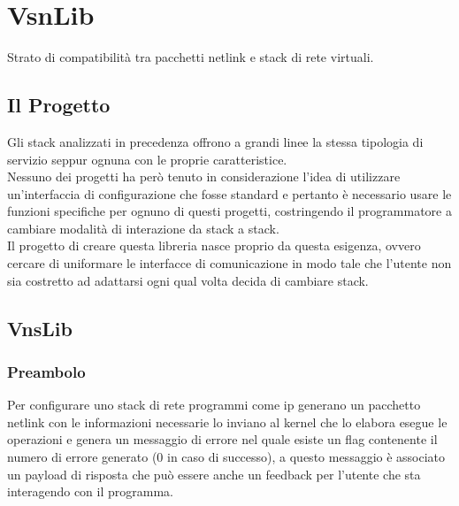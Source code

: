 

\chapter{VsnLib}                %
\lhead[\fancyplain{}{\bfseries\thepage}]{\fancyplain{}{\bfseries\rightmark}}
Strato di compatibilit\`a tra pacchetti netlink e stack di rete virtuali.

\section{Il Progetto}                 %
Gli stack analizzati in precedenza offrono a grandi linee la stessa tipologia di servizio seppur ognuna con le proprie caratteristice.\\
Nessuno dei progetti ha per\`o tenuto in considerazione l'idea di utilizzare un'interfaccia di configurazione che fosse standard e pertanto \`e necessario usare le funzioni specifiche per ognuno di questi progetti, costringendo il programmatore a cambiare modalit\`a di interazione da stack a stack.\\
Il progetto di creare questa libreria nasce proprio da questa esigenza, ovvero cercare di uniformare le interfacce di comunicazione in modo tale che l'utente non sia costretto ad adattarsi ogni qual volta decida di cambiare stack.\\
\section{VnsLib}
\subsection{Preambolo}
Per configurare uno stack di rete programmi come ip generano un pacchetto netlink con le informazioni necessarie lo inviano al kernel che lo elabora esegue le operazioni e genera un messaggio di errore nel quale esiste un flag contenente il numero di errore generato (0 in caso di successo), a questo messaggio \`e associato un payload di risposta che pu\`o essere anche un feedback per l'utente che sta interagendo con il programma.\\

